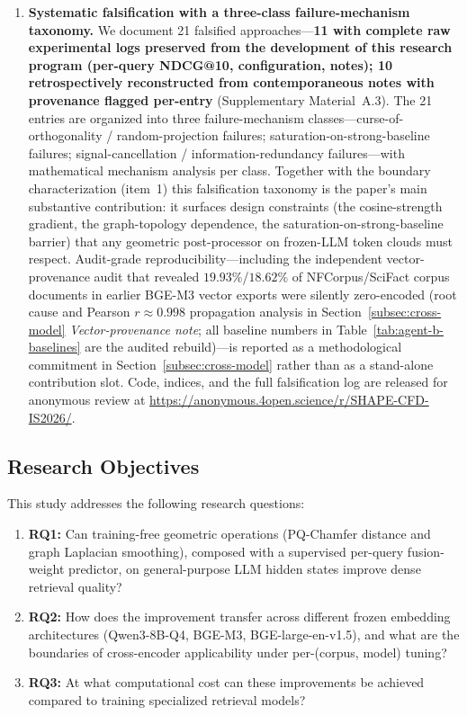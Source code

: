 \documentclass[review,1p]{elsarticle}
\begin{document}
\begin{enumerate}[leftmargin=*]
\item \textbf{Systematic falsification with a three-class failure-mechanism taxonomy.} We document 21 falsified approaches---\textbf{11 with complete raw experimental logs preserved from the development of this research program (per-query NDCG@10, configuration, notes); 10 retrospectively reconstructed from contemporaneous notes with provenance flagged per-entry} (Supplementary Material~A.3). The 21 entries are organized into three failure-mechanism classes---curse-of-orthogonality / random-projection failures; saturation-on-strong-baseline failures; signal-cancellation / information-redundancy failures---with mathematical mechanism analysis per class. Together with the boundary characterization (item~1) this falsification taxonomy is the paper's main substantive contribution: it surfaces design constraints (the cosine-strength gradient, the graph-topology dependence, the saturation-on-strong-baseline barrier) that any geometric post-processor on frozen-LLM token clouds must respect. Audit-grade reproducibility---including the independent vector-provenance audit that revealed $19.93\%$/$18.62\%$ of NFCorpus/SciFact corpus documents in earlier BGE-M3 vector exports were silently zero-encoded (root cause and Pearson $r\approx0.998$ propagation analysis in Section~\ref{subsec:cross-model} \emph{Vector-provenance note}; all baseline numbers in Table~\ref{tab:agent-b-baselines} are the audited rebuild)---is reported as a methodological commitment in Section~\ref{subsec:cross-model} rather than as a stand-alone contribution slot. Code, indices, and the full falsification log are released for anonymous review at \url{https://anonymous.4open.science/r/SHAPE-CFD-IS2026/}.
\end{enumerate}

\subsection{Research Objectives}
\label{subsec:research-objectives}

This study addresses the following research questions:
\begin{enumerate}
\item \textbf{RQ1:} Can training-free geometric operations (PQ-Chamfer distance and graph Laplacian smoothing), composed with a supervised per-query fusion-weight predictor, on general-purpose LLM hidden states improve dense retrieval quality?
\item \textbf{RQ2:} How does the improvement transfer across different frozen embedding architectures (Qwen3-8B-Q4, BGE-M3, BGE-large-en-v1.5), and what are the boundaries of cross-encoder applicability under per-(corpus, model) tuning?
\item \textbf{RQ3:} At what computational cost can these improvements be achieved compared to training specialized retrieval models?
\end{enumerate}
\end{document}
